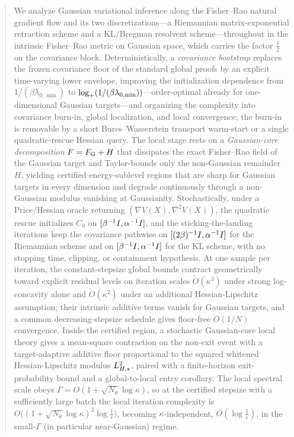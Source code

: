 \begin{abstract}
We analyze Gaussian variational inference along the Fisher--Rao natural gradient flow and its two
discretizations---a Riemannian matrix-exponential retraction scheme and a KL/Bregman resolvent
scheme---throughout in the intrinsic Fisher--Rao metric on Gaussian space, which carries the factor
$\tfrac12$ on the covariance block. Deterministically, a \emph{covariance bootstrap} replaces the
frozen covariance floor of the standard global proofs by an explicit time-varying lower envelope,
improving the initialization dependence from $1/(\beta\lambda_{0,\min})$ to
$\logp(1/(\beta\lambda_{0,\min}))$---order-optimal already for one-dimensional Gaussian targets---and
organizing the complexity into covariance burn-in, global localization, and local convergence; the
burn-in is removable by a short Bures--Wasserstein transport warm-start or a single quadratic-rescue
Hessian query. The local stage rests on a \emph{Gaussian-core decomposition} $F=\FGauss+H$ that
dissipates the exact Fisher--Rao field of the Gaussian target and Taylor-bounds only the non-Gaussian
remainder $H$, yielding certified energy-sublevel regions that are sharp for Gaussian targets in every
dimension and degrade continuously through a non-Gaussian modulus vanishing at Gaussianity.
Stochastically, under a Price/Hessian oracle returning $(\nabla V(X),\nabla^2V(X))$, the quadratic
rescue initializes $C_0$ on $[\beta^{-1}\Id,\alpha^{-1}\Id]$, and the sticking-the-landing iterations
keep the covariance pathwise on $[(2\beta)^{-1}\Id,\alpha^{-1}\Id]$ for the Riemannian scheme and on
$[\beta^{-1}\Id,\alpha^{-1}\Id]$ for the KL scheme, with no stopping time, clipping, or containment
hypothesis. At one sample per iteration, the constant-stepsize global bounds contract geometrically
toward explicit residual levels on iteration scales $\widetilde O(\kappa^3)$ under strong
log-concavity alone and $\widetilde O(\kappa^2)$ under an additional Hessian-Lipschitz assumption;
their intrinsic additive terms vanish for Gaussian targets, and a common decreasing-stepsize schedule
gives floor-free $O(1/N)$ convergence. Inside the certified region, a
stochastic Gaussian-core local theory gives a mean-square contraction on the non-exit event with a
target-adaptive additive floor proportional to the squared whitened Hessian-Lipschitz modulus
$\LHs^2$, paired with a finite-horizon exit-probability bound and a global-to-local entry corollary.
The local spectral scale obeys $\Gamma=O(1+\sqrt{N_\theta}\log\kappa)$, so at the certified stepsize
with a sufficiently large batch the local iteration complexity is
$O\bigl((1+\sqrt{N_\theta}\log\kappa)^2\log\tfrac1\epsilon\bigr)$, becoming $\kappa$-independent,
$O(\log\tfrac1\epsilon)$, in the small-$\Gamma$ (in particular near-Gaussian) regime.
\end{abstract}

